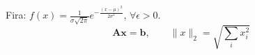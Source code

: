 \documentclass{article}
\begin{document}
Fira: $f(x) = \frac{1}{\sigma\sqrt{2\pi}} e^{-\frac{(x-\mu)^2}{2\sigma^2}}$, $\forall\epsilon>0$.
\[ \mathbf{A}\mathbf{x} = \mathbf{b}, \qquad \lVert x\rVert_2 = \sqrt{\textstyle\sum_i x_i^2} \]
\end{document}
